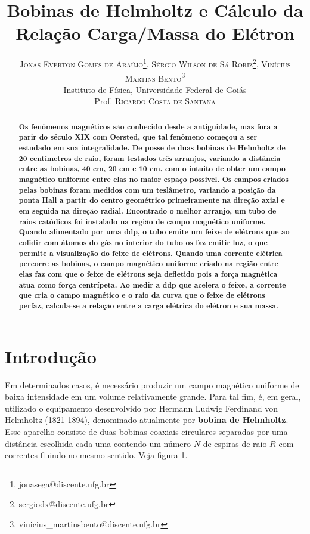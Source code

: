 \documentclass{article}
\title{\vspace{-18mm}\fontsize{16pt}{18pt}\selectfont\textbf{Bobinas de Helmholtz e Cálculo da Relação Carga/Massa do Elétron}}
\author{
\large
\textsc{Jonas Everton Gomes de Araújo\thanks{jonasega@discente.ufg.br }, Sérgio Wilson de Sá Roriz\thanks{sergiodx@discente.ufg.br}, Vinícius Martins Bento\thanks{vinicius\_martinsbento@discente.ufg.br}}\\[2mm]
\large Instituto de Física, Universidade Federal de Goiás \\
\large Prof. \textsc{Ricardo Costa de Santana}
}
\date{}
\begin{document}
\maketitle

\thispagestyle{fancy} 
 

\begin{abstract}
\textbf{Os fenômenos magnéticos são conhecido desde a antiguidade, mas fora a parir do século XIX com Oersted, que tal fenômeno começou a ser estudado em sua integralidade. De posse de duas bobinas de Helmholtz de 20 centímetros de raio, foram testados três arranjos, variando a distância entre as bobinas, 40 cm, 20 cm e 10 cm, com o intuito de obter um campo magnético uniforme entre elas no maior espaço possível. Os campos criados pelas bobinas foram medidos com um teslâmetro, variando a posição da ponta Hall a partir do centro geométrico primeiramente na direção axial e em seguida na direção radial. Encontrado o melhor arranjo, um tubo de raios catódicos foi instalado na região de campo magnético uniforme. Quando alimentado por uma ddp, o tubo emite um feixe de elétrons que ao colidir com átomos do gás no interior do tubo os faz emitir luz, o que permite  a visualização do feixe de elétrons. Quando uma corrente elétrica percorre as bobinas, o campo magnético uniforme criado na região entre elas faz com que o feixe de elétrons seja defletido pois a força magnética atua como força centrípeta. Ao medir a ddp que acelera o feixe, a corrente que cria o campo magnético e o raio da curva que o feixe de elétrons perfaz, calcula-se a relação entre a carga elétrica do elétron e sua massa.}
\end{abstract}
%
\vspace{0.5cm}

\section{Introdução}

Em determinados casos, é necessário produzir um campo magnético uniforme de baixa intensidade em um volume relativamente grande. Para tal fim, é, em geral, utilizado o equipamento desenvolvido por Hermann Ludwig Ferdinand von Helmholtz (1821-1894), denominado atualmente por \textbf{bobina de Helmholtz}. Esse aparelho consiste de duas bobinas coaxiais circulares separadas por uma distância escolhida cada uma contendo um número $N$ de espiras de raio $R$ com correntes fluindo no mesmo sentido. Veja figura 1.
\end{document}
